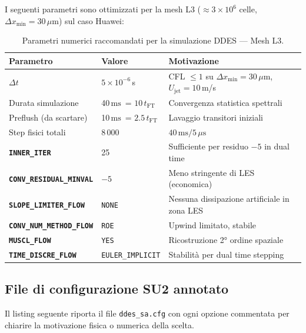 \documentclass[11pt,a4paper]{article}
\newcommand{\kw}[1]{\texttt{\color{keywordcolor}\bfseries #1}}
\newcommand{\mum}{\ensuremath{\,\mu\mathrm{m}}}
\newcommand{\mus}{\ensuremath{\,\mu\mathrm{s}}}
\providecommand{\ms}{}\renewcommand{\ms}{\ensuremath{\,\mathrm{ms}}}
\newcommand{\tFT}{t_{\mathrm{FT}}}
\begin{document}
I seguenti parametri sono ottimizzati per la mesh L3 ($\approx 3 \times 10^6$
celle, $\Delta x_\mathrm{min} = 30\mum$) sul caso Huawei:

\begin{table}[H]
  \centering
  \caption{Parametri numerici raccomandati per la simulazione DDES — Mesh L3.}
  \label{tab:ddes_params}
  \begin{tabular}{lll}
    \toprule
    \textbf{Parametro} & \textbf{Valore} & \textbf{Motivazione} \\
    \midrule
    $\Delta t$ & $5 \times 10^{-6}$\,s & CFL $\leq 1$ su $\Delta x_\mathrm{min}=30\mum$, $U_\mathrm{jet}=10$\,m/s \\
    Durata simulazione & 40\ms\ = $10\,\tFT$ & Convergenza statistica spettrali \\
    Preflush (da scartare) & 10\ms\ = $2.5\,\tFT$ & Lavaggio transitori iniziali \\
    Step fisici totali & 8\,000 & $40\ms / 5\mus$ \\
    \kw{INNER\_ITER} & 25 & Sufficiente per residuo $-5$ in dual time \\
    \kw{CONV\_RESIDUAL\_MINVAL} & $-5$ & Meno stringente di LES (economica) \\
    \kw{SLOPE\_LIMITER\_FLOW} & \texttt{NONE} & Nessuna dissipazione artificiale in zona LES \\
    \kw{CONV\_NUM\_METHOD\_FLOW} & \texttt{ROE} & Upwind limitato, stabile \\
    \kw{MUSCL\_FLOW} & \texttt{YES} & Ricostruzione 2° ordine spaziale \\
    \kw{TIME\_DISCRE\_FLOW} & \texttt{EULER\_IMPLICIT} & Stabilità per dual time stepping \\
    \bottomrule
  \end{tabular}
\end{table}

\subsection{File di configurazione SU2 annotato}

Il listing seguente riporta il file \texttt{ddes\_sa.cfg} con ogni opzione
commentata per chiarire la motivazione fisica o numerica della scelta.
\end{document}

